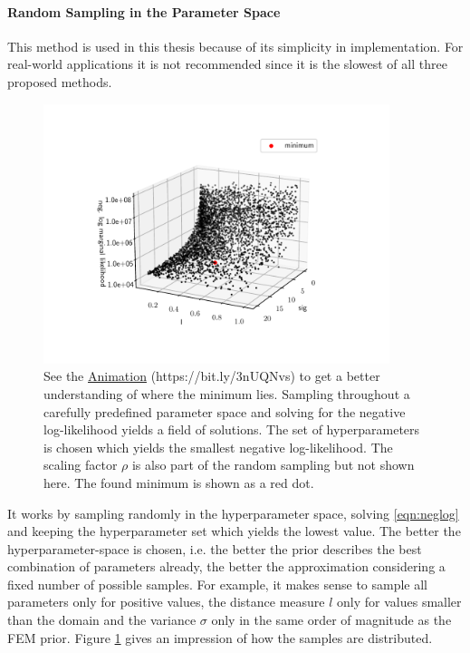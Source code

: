 \documentclass[%
  a4paper,oneside,%
  11pt,%
  smallchapters,
  style=printdev,
  extramargin,
  green,%
  rgb, <cmyk>
  ]{tubsbook}
\begin{document}
\paragraph{Random Sampling in the Parameter Space}
This method is used in this thesis because of its simplicity in implementation. For real-world applications it is not recommended since it is the slowest of all three proposed methods.
\begin{figure}[!ht]
\includegraphics[width=0.9\textwidth]{pics/RandomHyperParSearch.pdf}
\centering
\caption[Point cloud of the random search for the hyperparameters which yield the minimum negative log-likelihood]{See the \href{https://github.com/herluc/herluc.github.io/blob/main/MLL.gif}{Animation} (https://bit.ly/3nUQNvs) to get a better understanding of where the minimum lies. Sampling throughout a carefully predefined parameter space and solving for the negative log-likelihood yields a field of solutions. The set of hyperparameters is chosen which yields the smallest negative log-likelihood. The scaling factor $\rho$ is also part of the random sampling but not shown here. The found minimum is shown as a red dot.}
\label{fig:RandSampHyper}
\end{figure}
It works by sampling randomly in the hyperparameter space, solving \eqref{eqn:neglog} and keeping the hyperparameter set which yields the lowest value. The better the hyperparameter-space is chosen, i.e. the better the prior describes the best combination of parameters already, the better the approximation considering a fixed number of possible samples. For example, it makes sense to sample all parameters only for positive values,  the distance measure $l$ only for values smaller than the domain and the variance $\sigma$ only in the same order of magnitude as the FEM prior. Figure \ref{fig:RandSampHyper} gives an impression of how the samples are distributed.
\FloatBarrier
\end{document}
